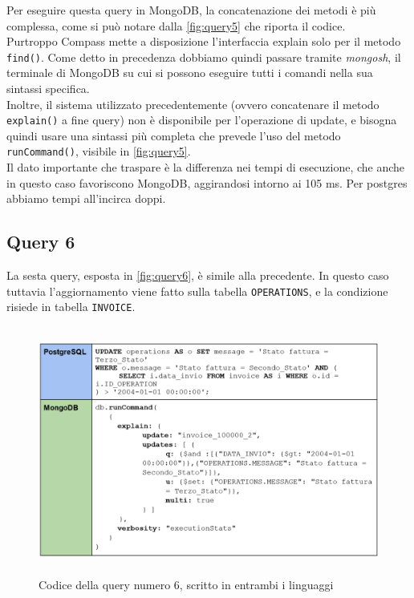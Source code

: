 \noindent Per eseguire questa query in MongoDB, la concatenazione dei metodi è più complessa, come si può notare dalla \autoref{fig:query5} che riporta il codice.\\
Purtroppo Compass mette a disposizione l'interfaccia explain solo per il metodo \texttt{find()}. Come detto in precedenza dobbiamo quindi passare tramite \textit{mongosh}, il terminale di MongoDB su cui si possono eseguire tutti i comandi nella sua sintassi specifica.\\
Inoltre, il sistema utilizzato precedentemente (ovvero concatenare il metodo \texttt{explain()} a fine query) non è disponibile per l'operazione di update, e bisogna quindi usare una sintassi più completa che prevede l'uso del metodo \texttt{runCommand()}, visibile in \autoref{fig:query5}.\\

\noindent Il dato importante che traspare è la differenza nei tempi di esecuzione, che anche in questo caso favoriscono MongoDB, aggirandosi intorno ai 105 ms. Per postgres abbiamo tempi all'incirca doppi.\\


\subsection{Query 6}
La sesta query, esposta in \autoref{fig:query6}, è simile alla precedente. In questo caso tuttavia l'aggiornamento viene fatto sulla tabella \texttt{OPERATIONS}, e la condizione risiede in tabella \texttt{INVOICE}.\\

\begin{figure}[htbp]
\begin{center}
\includegraphics[height=22em]{immagini/query/query6.png}
\caption{Codice della query numero 6, scritto in entrambi i linguaggi}
\label{fig:query6}
\end{center}
\end{figure}

